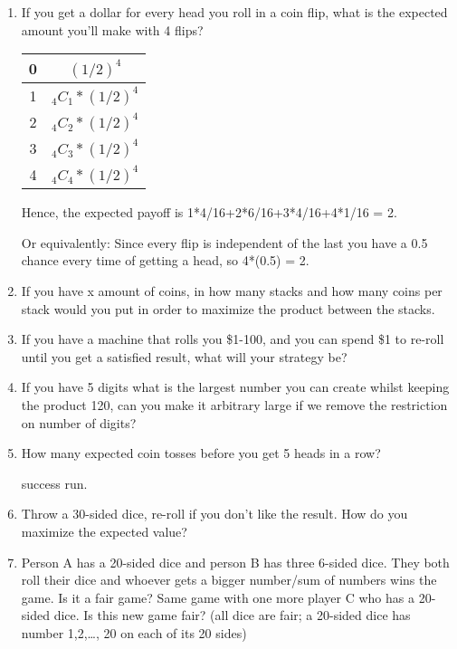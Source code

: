 \documentclass{article}
\begin{document}
\begin{enumerate}
    \item If you get a dollar for every head you roll in a coin flip, what is the expected amount you'll make with 4 flips?

    \begin{table}[h]
        \centering
        \begin{tabular}{c|c}
            \hline
            0 & $(1/2)^4$ \\
            \hline
            1 & $_4C_1*(1/2)^4$  \\
            \hline
            2 & $_4C_2*(1/2)^4$ \\
            \hline
            3 & $_4C_3*(1/2)^4$ \\
            \hline
            4 & $_4C_4*(1/2)^4$ \\
            \hline 
        \end{tabular}
        \label{tab:my_label}
    \end{table}
    Hence, the expected payoff is 1*4/16+2*6/16+3*4/16+4*1/16 = 2.

    Or equivalently: Since every flip is independent of the last you have a 0.5 chance every time of getting a head, so 4*(0.5) = 2.

    \item If you have x amount of coins, in how many stacks and how many coins per stack would you put in order to maximize the product between the stacks.

    \item If you have a machine that rolls you \$1-100, and you can spend \$1 to re-roll until you get a satisfied result, what will your strategy be?

    \item If you have 5 digits what is the largest number you can create whilst keeping the product 120, can you make it arbitrary large if we remove the restriction on number of digits?

    \item How many expected coin tosses before you get 5 heads in a row?

    success run.

    \item Throw a 30-sided dice, re-roll if you don't like the result. How do you maximize the expected value?

    \item Person A has a 20-sided dice and person B has three 6-sided dice. They both roll their dice and whoever gets a bigger number/sum of numbers wins the game. Is it a fair game? Same game with one more player C who has a 20-sided dice. Is this new game fair? (all dice are fair; a 20-sided dice has number 1,2,…, 20 on each of its 20 sides)


\end{enumerate}
\end{document}
